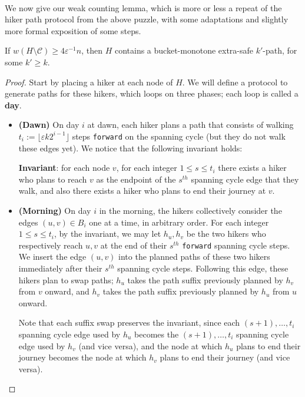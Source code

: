\documentclass{theoretics}
\newcommand{\eps}{\varepsilon}
\newcommand{\cee}{\mathcal{C}}
\newcommand{\forward}{\texttt{forward}}
\begin{document}
~\\We now give our weak counting lemma, which is more or less a repeat of the hiker path protocol from the above puzzle, with some adaptations and slightly more formal exposition of some steps.

\begin{lemma} 
If $w(H \setminus \cee) \ge 4 \eps^{-1} n$, then $H$ contains a bucket-monotone extra-safe $k'$-path, for some $k' \ge k$.
\end{lemma}
\begin{proof}
Start by placing a hiker at each node of $H$.
We will define a protocol to generate paths for these hikers, which loops on three phases; each loop is called a \textbf{day}.

\begin{itemize}
\item \textbf{(Dawn)} On day $i$ at dawn, each hiker plans a path that consists of walking $t_i :=\lfloor \eps k 2^{i-1} \rfloor$ steps \forward{} on the spanning cycle (but they do not walk these edges yet).
We notice that the following invariant holds:
\begin{center}
\textbf{Invariant}: for each node $v$, for each integer $1 \le s \le t_i$ there exists a hiker who plans to reach $v$ as the endpoint of the $s^{th}$ spanning cycle edge that they walk, and also there exists a hiker who plans to end their journey at $v$.
\end{center}

\item \textbf{(Morning)} On day $i$ in the morning, the hikers collectively consider the edges $(u, v) \in B_i$ one at a time, in arbitrary order.
For each integer $1 \le s \le t_i$, by the invariant, we may let $h_{u}, h_{v}$ be the two hikers who respectively reach $u, v$ at the end of their $s^{th}$ \forward{} spanning cycle steps.
We insert the edge $(u, v)$ into the planned paths of these two hikers immediately after their $s^{th}$ spanning cycle steps.
Following this edge, these hikers plan to swap paths; $h_{u}$ takes the path suffix previously planned by $h_{v}$ from $v$ onward, and $h_{v}$ takes the path suffix previously planned by $h_{u}$ from $u$ onward.

Note that each suffix swap preserves the invariant, since each $(s+1), \dots, t_i$ spanning cycle edge used by $h_u$ becomes the $(s+1), \dots, t_i$ spanning cycle edge used by $h_v$ (and vice versa), and the node at which $h_u$ plans to end their journey becomes the node at which $h_v$ plans to end their journey (and vice versa).


\end{itemize}
\end{proof}
\end{document}
